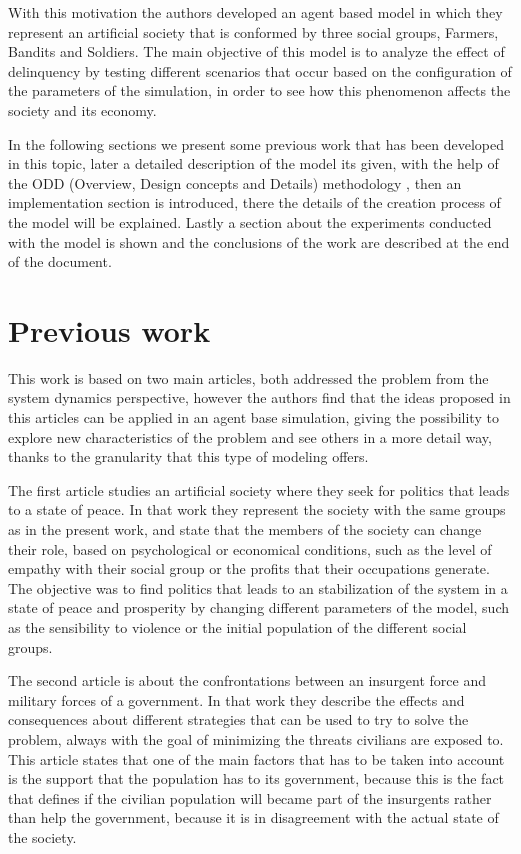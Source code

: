 \documentclass{wscpaperproc}
\begin{document}
With this motivation the authors developed an agent based model in which they
represent an artificial society that is conformed by three social groups,
Farmers, Bandits and Soldiers. The main objective of this model is to
analyze the effect of delinquency by testing different scenarios that
occur based on the configuration of the parameters of the simulation,
in order to see how this phenomenon affects the society and its
economy.

In the following sections we present some previous work that has been developed
in this topic, later a detailed description of the model its given, with the
help of the ODD (Overview, Design concepts and Details) methodology
\cite{modbook}, then an implementation section is introduced, there the details
of the creation process of the model will be explained. Lastly a section about
the experiments conducted with the model is shown and the conclusions of the
work are described at the end of the document.

\section{Previous work}

This work is based on two main articles, both addressed the problem from the
system dynamics perspective, however the authors find that the ideas proposed in
this articles can be applied in an agent base simulation, giving the possibility
to explore new characteristics of the problem and see others in a more
detail way, thanks to the granularity that this type of modeling offers.

The first article studies an artificial society where they seek for politics
that leads to a state of peace. In that work they represent the society with
the same groups as in the present work, and state that the members of the
society can change their role, based on psychological or economical conditions,
such as the level of empathy with their social group or the profits
that their occupations generate. The objective was to find politics
that leads to an stabilization of the system in a state of peace and
prosperity by changing different parameters of the model, such as the
sensibility to violence or the initial population of the different social
groups. \cite{article1}

The second article is about the confrontations between an insurgent force and
military forces of a government. In that work they describe the effects and
consequences about different strategies that can be used to try to solve the
problem, always with the goal of minimizing the threats civilians are exposed to.
This article states that one of the main factors that has to be taken
into account is the support that the population has to its government, because
this is the fact that defines if the civilian population will became part of the
insurgents rather than help the government, because it is in disagreement with
the actual state of the society. \cite{article2}
\end{document}
